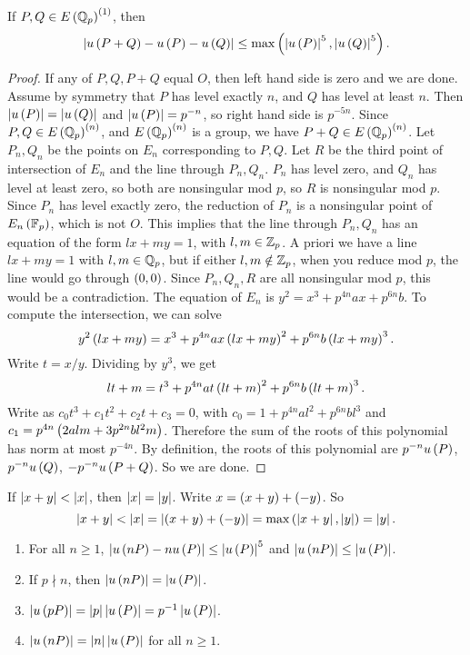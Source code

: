 \begin{lemma}
\label{lem:7.5}
If $ P, Q \in E\left( \mathbb{Q}_p \right)^{\left( 1 \right)} $, then
$$ \left\lvert u\left( P + Q \right) - u\left( P \right) - u\left( Q \right) \right\rvert \le \max\left( \left\lvert u\left( P \right) \right\rvert^5, \left\lvert u\left( Q \right) \right\rvert^5 \right). $$
\end{lemma}

\begin{proof}
If any of $ P, Q, P + Q $ equal $ O $, then left hand side is zero and we are done. Assume by symmetry that $ P $ has level exactly $ n $, and $ Q $ has level at least $ n $. Then $ \left\lvert u\left( P \right) \right\rvert = \left\lvert u\left( Q \right) \right\rvert $ and $ \left\lvert u\left( P \right) \right\rvert = p^{-n} $, so right hand side is $ p^{-5n} $. Since $ P, Q \in E\left( \mathbb{Q}_p \right)^{\left( n \right)} $, and $ E\left( \mathbb{Q}_p \right)^{\left( n \right)} $ is a group, we have $ P + Q \in E\left( \mathbb{Q}_p \right)^{\left( n \right)} $. Let $ P_n, Q_n $ be the points on $ E_n $ corresponding to $ P, Q $. Let $ R $ be the third point of intersection of $ E_n $ and the line through $ P_n, Q_n $. $ P_n $ has level zero, and $ Q_n $ has level at least zero, so both are nonsingular mod $ p $, so $ R $ is nonsingular mod $ p $. Since $ P_n $ has level exactly zero, the reduction of $ P_n $ is a nonsingular point of $ E_n\left( \mathbb{F}_p \right) $, which is not $ O $. This implies that the line through $ P_n, Q_n $ has an equation of the form $ lx + my = 1 $, with $ l, m \in \mathbb{Z}_p $. A priori we have a line $ lx + my = 1 $ with $ l, m \in \mathbb{Q}_p $, but if either $ l, m \notin \mathbb{Z}_p $, when you reduce mod $ p $, the line would go through $ \left( 0, 0 \right) $. Since $ P_n, Q_n, R $ are all nonsingular mod $ p $, this would be a contradiction. The equation of $ E_n $ is $ y^2 = x^3 + p^{4n}ax + p^{6n}b $. To compute the intersection, we can solve
$$ y^2\left( lx + my \right) = x^3 + p^{4n}ax\left( lx + my \right)^2 + p^{6n}b\left( lx + my \right)^3. $$
Write $ t = x / y $. Dividing by $ y^3 $, we get
$$ lt + m = t^3 + p^{4n}at\left( lt + m \right)^2 + p^{6n}b\left( lt + m \right)^3. $$
Write as $ c_0t^3 + c_1t^2 + c_2t + c_3 = 0 $, with $ c_0 = 1 + p^{4n}al^2 + p^{6n}bl^3 $ and $ c_1 = p^{4n}\left( 2alm + 3p^{2n}bl^2m \right) $. Therefore the sum of the roots of this polynomial has norm at most $ p^{-4n} $. By definition, the roots of this polynomial are $ p^{-n}u\left( P \right) $, $ p^{-n}u\left( Q \right) $, $ -p^{-n}u\left( P + Q \right) $. So we are done.
\end{proof}


If $ \left\lvert x + y \right\rvert < \left\lvert x \right\rvert $, then $ \left\lvert x \right\rvert = \left\lvert y \right\rvert $. Write $ x = \left( x + y \right) + \left( -y \right) $. So
$$ \left\lvert x + y \right\rvert < \left\lvert x \right\rvert = \left\lvert \left( x + y \right) + \left( -y \right) \right\rvert = \max\left( \left\lvert x + y \right\rvert, \left\lvert y \right\rvert \right) = \left\lvert y \right\rvert. $$

\begin{corollary}
\hfill
\begin{enumerate}
\item For all $ n \ge 1 $, $ \left\lvert u\left( nP \right) - nu\left( P \right) \right\rvert \le \left\lvert u\left( P \right) \right\rvert^5 $ and $ \left\lvert u\left( nP \right) \right\rvert \le \left\lvert u\left( P \right) \right\rvert $.
\item If $ p \nmid n $, then $ \left\lvert u\left( nP \right) \right\rvert = \left\lvert u\left( P \right) \right\rvert $.
\item $ \left\lvert u\left( pP \right) \right\rvert = \left\lvert p \right\rvert\left\lvert u\left( P \right) \right\rvert = p^{-1}\left\lvert u\left( P \right) \right\rvert $.
\item $ \left\lvert u\left( nP \right) \right\rvert = \left\lvert n \right\rvert\left\lvert u\left( P \right) \right\rvert $ for all $ n \ge 1 $.
\end{enumerate}
\end{corollary}

